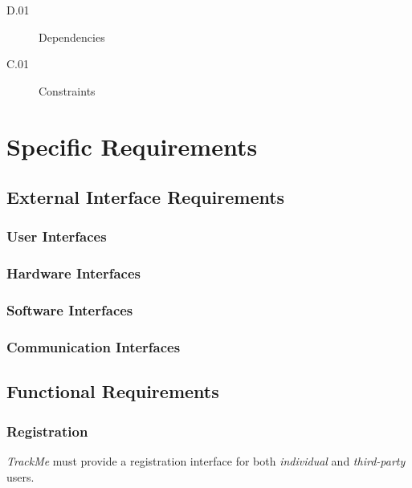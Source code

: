 \documentclass[a4paper]{article}
\begin{document}
        \begin{description}
            \item[D.01] Dependencies
        \end{description}
        
        \begin{description}
            \item[C.01] Constraints
        \end{description}
\newpage
\section{Specific Requirements}

    \subsection{External Interface Requirements}
        
        \subsubsection{User Interfaces}
        
        \subsubsection{Hardware Interfaces}
        
        \subsubsection{Software Interfaces}
        
        \subsubsection{Communication Interfaces}
    
    \subsection{Functional Requirements}
        
        \subsubsection{Registration}
        \textit{TrackMe} must provide a registration interface for both \textit{individual} and \textit{third-party} users.
        
\end{document}
